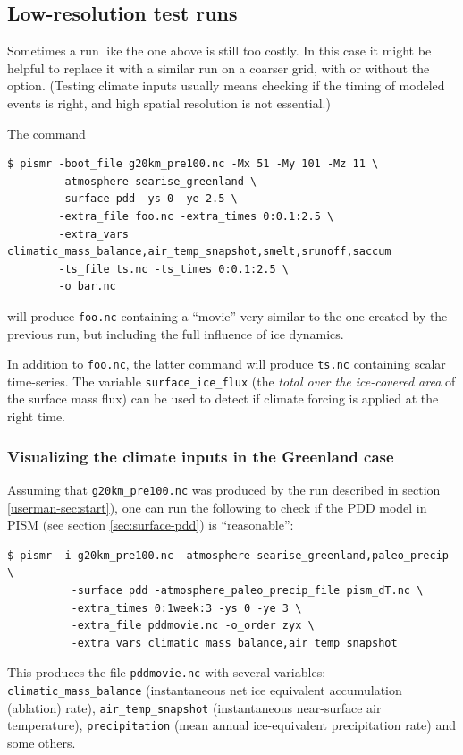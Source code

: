 \documentclass[titlepage,letterpaper,final]{scrartcl}
\begin{document}
\subsection{Low-resolution test runs}
\label{sec:low-resolution-test-runs}

Sometimes a run like the one above is still too costly. In this case it might be helpful to replace it with a similar run on a coarser grid, with or without the  option. (Testing climate inputs usually means checking if the timing of modeled events is right, and high spatial resolution is not essential.)

The command
\begin{verbatim}
$ pismr -boot_file g20km_pre100.nc -Mx 51 -My 101 -Mz 11 \
        -atmosphere searise_greenland \
        -surface pdd -ys 0 -ye 2.5 \
        -extra_file foo.nc -extra_times 0:0.1:2.5 \
        -extra_vars climatic_mass_balance,air_temp_snapshot,smelt,srunoff,saccum
        -ts_file ts.nc -ts_times 0:0.1:2.5 \
        -o bar.nc
\end{verbatim}%
will produce \texttt{foo.nc} containing a ``movie'' very similar to the one created by the previous run, but including the full influence of ice dynamics.

In addition to \texttt{foo.nc}, the latter command will produce \texttt{ts.nc} containing scalar time-series. The variable \texttt{surface_ice_flux} (the \emph{total over the ice-covered area} of the surface mass flux) can be used to detect if climate forcing is applied at the right time.

\subsubsection{Visualizing the climate inputs in the Greenland case}
\label{sec:pdd-series}

Assuming that \texttt{g20km_pre100.nc} was produced by the run described in section
\ref{userman-sec:start}), one can run the following to check if the PDD
model in PISM (see section \ref{sec:surface-pdd}) is ``reasonable'':
\begin{verbatim}
$ pismr -i g20km_pre100.nc -atmosphere searise_greenland,paleo_precip \
          -surface pdd -atmosphere_paleo_precip_file pism_dT.nc \
          -extra_times 0:1week:3 -ys 0 -ye 3 \
          -extra_file pddmovie.nc -o_order zyx \
          -extra_vars climatic_mass_balance,air_temp_snapshot
\end{verbatim}%
This produces the file \texttt{pddmovie.nc} with several variables: \texttt{climatic_mass_balance}
(instantaneous net ice equivalent accumulation (ablation) rate), \texttt{air_temp_snapshot}
(instantaneous near-surface air temperature), \texttt{precipitation} (mean annual
ice-equivalent precipitation rate) and some others.
\end{document}
